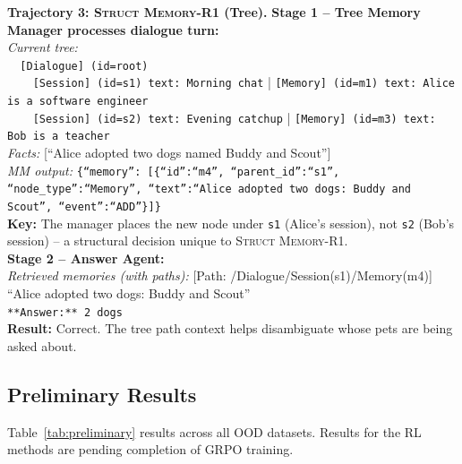 \documentclass{article}
\theoremstyle{definition}
\begin{document}
\begin{tcolorbox}[aclbox, width=\linewidth]
\small
\textbf{Trajectory 3: \textsc{Struct Memory-R1} (Tree).}
\textbf{Stage 1 -- Tree Memory Manager processes dialogue turn:}\\
\textit{Current tree:}\\
\texttt{~~[Dialogue] (id=root)}\\
\texttt{~~~~[Session] (id=s1) text: Morning chat} | 
\texttt{[Memory] (id=m1) text: Alice is a software engineer}\\
\texttt{~~~~[Session] (id=s2) text: Evening catchup} | 
\texttt{[Memory] (id=m3) text: Bob is a teacher}\\[2pt]
\textit{Facts:} [``Alice adopted two dogs named Buddy and Scout'']\\
\textit{MM output:} \texttt{\{``memory'': [\{``id'':``m4'', ``parent\_id'':``s1'', ``node\_type'':``Memory'', ``text'':``Alice adopted two dogs: Buddy and Scout'', ``event'':``ADD''\}]\}}\\[4pt]
\textbf{Key:} The manager places the new node under \texttt{s1} (Alice's session), not \texttt{s2} (Bob's session) -- a structural decision unique to \textsc{Struct Memory-R1}.\\[4pt]
\textbf{Stage 2 -- Answer Agent:}\\
\textit{Retrieved memories (with paths):} [Path: /Dialogue/Session(s1)/Memory(m4)] ``Alice adopted two dogs: Buddy and Scout''\\
\texttt{**Answer:** 2 dogs}\\[2pt]
\textbf{Result:} \textcolor{green!50!black}{Correct}. The tree path context helps disambiguate whose pets are being asked about.
\end{tcolorbox}

\subsection{Preliminary Results}

Table~\ref{tab:preliminary} results across all OOD datasets. Results for the RL methods are pending completion of GRPO training.
\end{document}
